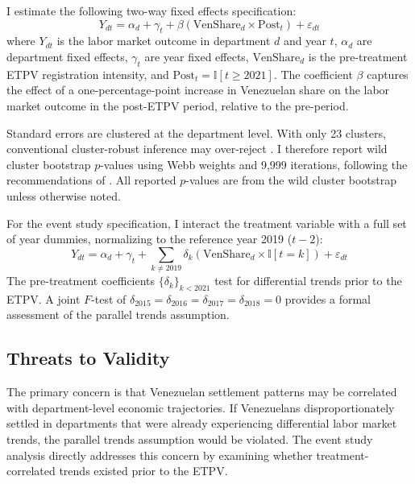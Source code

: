 \documentclass[12pt]{article}
\newcommand{\ind}{\mathbb{I}}
\begin{document}
I estimate the following two-way fixed effects specification:
\begin{equation}
Y_{dt} = \alpha_d + \gamma_t + \beta \left(\text{VenShare}_d \times \text{Post}_t\right) + \varepsilon_{dt}
\label{eq:main}
\end{equation}
where $Y_{dt}$ is the labor market outcome in department $d$ and year $t$, $\alpha_d$ are department fixed effects, $\gamma_t$ are year fixed effects, $\text{VenShare}_d$ is the pre-treatment ETPV registration intensity, and $\text{Post}_t = \ind[t \geq 2021]$. The coefficient $\beta$ captures the effect of a one-percentage-point increase in Venezuelan share on the labor market outcome in the post-ETPV period, relative to the pre-period.

Standard errors are clustered at the department level. With only 23 clusters, conventional cluster-robust inference may over-reject \citep{cameron2008bootstrap}. I therefore report wild cluster bootstrap $p$-values using Webb weights and 9,999 iterations, following the recommendations of \citet{roodman2019fast}. All reported $p$-values are from the wild cluster bootstrap unless otherwise noted.

For the event study specification, I interact the treatment variable with a full set of year dummies, normalizing to the reference year 2019 ($t-2$):
\begin{equation}
Y_{dt} = \alpha_d + \gamma_t + \sum_{k \neq 2019} \delta_k \left(\text{VenShare}_d \times \ind[t = k]\right) + \varepsilon_{dt}
\label{eq:eventstudy}
\end{equation}
The pre-treatment coefficients $\{\delta_k\}_{k < 2021}$ test for differential trends prior to the ETPV. A joint $F$-test of $\delta_{2015} = \delta_{2016} = \delta_{2017} = \delta_{2018} = 0$ provides a formal assessment of the parallel trends assumption.

\subsection{Threats to Validity}

The primary concern is that Venezuelan settlement patterns may be correlated with department-level economic trajectories. If Venezuelans disproportionately settled in departments that were already experiencing differential labor market trends, the parallel trends assumption would be violated. The event study analysis directly addresses this concern by examining whether treatment-correlated trends existed prior to the ETPV.
\end{document}
